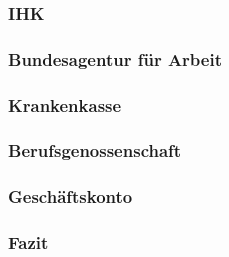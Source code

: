 \subsubsection{IHK} \label{ihk}

\subsubsection{Bundesagentur für Arbeit} \label{bundesagenturFuerArbeit}

\subsubsection{Krankenkasse} \label{krankenkasse}

\subsubsection{Berufsgenossenschaft} \label{berufsgenossenschaft}

\subsubsection{Geschäftskonto} \label{geschaeftskonto}

\subsubsection{Fazit} \label{fazitDigitaleBehoerden}

